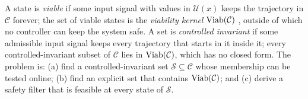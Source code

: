 A state is \emph{viable} if some input signal with values in $\mathcal{U}(x)$ keeps the trajectory in $\mathcal{C}$ forever; the set of viable states is the \emph{viability kernel} $\operatorname{Viab}(\mathcal{C})$ \cite{aubin1991viability}, outside of which no controller can keep the system safe. A set is \emph{controlled invariant} if some admissible input signal keeps every trajectory that starts in it inside it; every controlled-invariant subset of $\mathcal{C}$ lies in $\operatorname{Viab}(\mathcal{C})$, which has no closed form. The problem is: (a) find a controlled-invariant set $\mathcal{S}\subseteq\mathcal{C}$ whose membership can be tested online; (b) find an explicit set that contains $\operatorname{Viab}(\mathcal{C})$; and (c) derive a safety filter that is feasible at every state of $\mathcal{S}$.